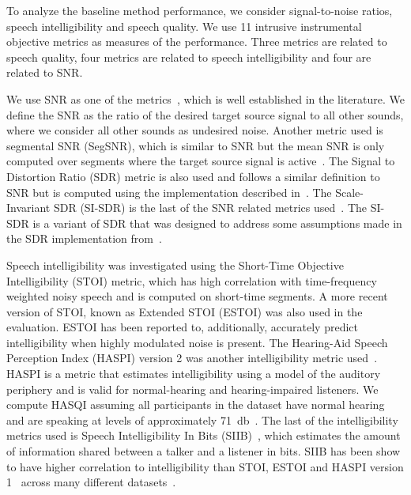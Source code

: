 \documentclass[journal]{IEEEtran}
\begin{document}
\begin{table*}[htb!]
\begin{center}
\begin{tabular}
{{To analyze the baseline method performance, we consider signal-to-noise ratios, speech intelligibility and speech quality.
We use 11 intrusive instrumental objective metrics as measures of the performance. 
Three metrics are related to speech quality, four metrics are related to speech intelligibility and four are related to SNR.

We use SNR as one of the metrics~\cite{brookes1997voicebox}, which is well established in the literature. We define the SNR as the ratio of the desired target source signal to all other sounds, where we consider all other sounds as undesired noise.
Another metric used is segmental SNR (SegSNR), which is similar to SNR but the mean SNR is only computed over segments where the target source signal is active~\cite{brookes1997voicebox}.
The Signal to Distortion Ratio (SDR) metric is also used and follows a similar definition to SNR but is computed using the implementation described in~\cite{vincent2006performance}.
The Scale-Invariant SDR (SI-SDR) is the last of the SNR related metrics used~\cite{roux2019sdr}. The SI-SDR is a variant of SDR that was designed to address some assumptions made in the SDR implementation from~\cite{vincent2006performance}.

Speech intelligibility was investigated using the Short-Time Objective Intelligibility (STOI) metric, which has high correlation with time-frequency weighted noisy speech and is computed on short-time segments.
A more recent version of STOI, known as Extended STOI (ESTOI) was also used in the evaluation. ESTOI has been reported to, additionally, accurately predict intelligibility when highly modulated noise is present.
The Hearing-Aid Speech Perception Index (HASPI) version 2 was another intelligibility metric used~\cite{kates2021haspiv2}. HASPI is a metric that estimates intelligibility using a model of the auditory periphery and is valid for normal-hearing and hearing-impaired listeners.
We compute HASQI assuming all participants in the dataset have normal hearing and are speaking at levels of approximately \SI{71}{\decibel}~.
The last of the intelligibility metrics used is Speech Intelligibility In Bits (SIIB)~\cite{vankuyk2018instrumental}, which estimates the amount of information shared between a talker and a listener in bits.
SIIB has been show to have higher correlation to intelligibility than STOI, ESTOI and HASPI version 1~\cite{kates2021haspiv1} across many different datasets~\cite{vankuyk2018evaluation}.

}}
\end{tabular}
\end{center}
\end{table*}
\end{document}

